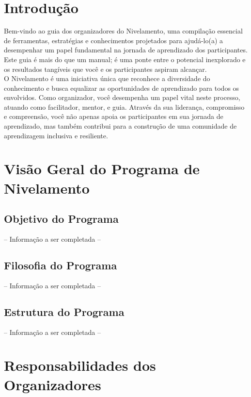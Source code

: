 \section{Introdução}

Bem-vindo ao guia dos organizadores do Nivelamento, uma compilação essencial de ferramentas, estratégias e conhecimentos projetados para ajudá-lo(a) a desempenhar um papel fundamental na jornada de aprendizado dos participantes. Este guia é mais do que um manual; é uma ponte entre o potencial inexplorado e os resultados tangíveis que você e os participantes aspiram alcançar.\\

O Nivelamento é uma iniciativa única que reconhece a diversidade do conhecimento e busca equalizar as oportunidades de aprendizado para todos os envolvidos. Como organizador, você desempenha um papel vital neste processo, atuando como facilitador, mentor, e guia. Através da sua liderança, compromisso e compreensão, você não apenas apoia os participantes em sua jornada de aprendizado, mas também contribui para a construção de uma comunidade de aprendizagem inclusiva e resiliente.\\

\section{Visão Geral do Programa de Nivelamento}

\subsection{Objetivo do Programa}

-- Informação a ser completada --

\subsection{Filosofia do Programa}

-- Informação a ser completada --

\subsection{Estrutura do Programa}

-- Informação a ser completada --

\section{Responsabilidades dos Organizadores}

